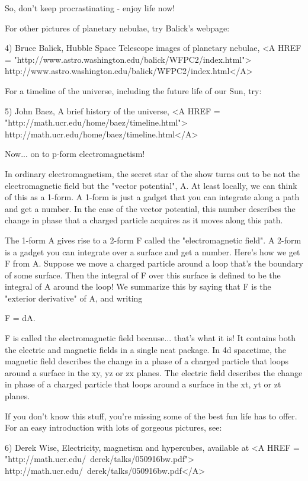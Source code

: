So, don't keep procrastinating - enjoy life now!

For other pictures of planetary nebulae, try Balick's webpage:

4) Bruce Balick, Hubble Space Telescope images of planetary nebulae,
<A HREF = "http://www.astro.washington.edu/balick/WFPC2/index.html">
http://www.astro.washington.edu/balick/WFPC2/index.html</A>

For a timeline of the universe, including the future life of our
Sun, try:

5) John Baez, A brief history of the universe,
<A HREF = "http://math.ucr.edu/home/baez/timeline.html">
http://math.ucr.edu/home/baez/timeline.html</A>

Now... on to p-form electromagnetism!

In ordinary electromagnetism, the secret star of the show turns out
to be not the electromagnetic field but the "vector potential", A. 
At least locally, we can think of this as a 1-form.  A 1-form is just
a gadget that you can integrate along a path and get a number.  In the
case of the vector potential, this number describes the change in 
phase that a charged particle acquires as it moves along this path.  

The 1-form A gives rise to a 2-form F called the 
"electromagnetic field".
A 2-form is a gadget you can integrate over a surface and get a 
number.  Here's how we get F from A.  Suppose we move a charged particle 
around a loop that's the boundary of some surface.   Then the integral 
of F over this surface is defined to be the integral of A around the loop!  
We summarize this by saying that F is the "exterior derivative" of A,
and writing

F = dA.

F is called the electromagnetic field because... that's what it is!
It contains both the electric and magnetic fields in a single neat
package.  In 4d spacetime, the magnetic field describes the change in 
a phase of a charged particle that loops around a surface in the 
xy, yz or zx planes.  The electric field describes the change in phase
of a charged particle that loops around a surface in the xt, yt or zt 
planes.  

If you don't know this stuff, you're missing some of the best fun
life has to offer.  For an easy introduction with lots of gorgeous 
pictures, see:

6) Derek Wise, Electricity, magnetism and hypercubes, available at
<A HREF = "http://math.ucr.edu/~derek/talks/050916bw.pdf">
http://math.ucr.edu/~derek/talks/050916bw.pdf</A>


